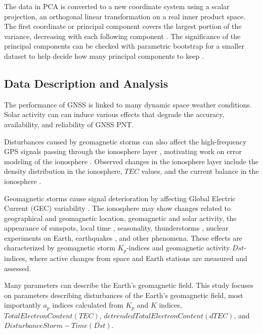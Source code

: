 \documentclass[sn-mathphys-num]{sn-jnl}%
\begin{document}
The data in PCA is converted to a new coordinate system using a scalar projection, an orthogonal linear transformation on a real inner product space. The first coordinate or principal component covers the largest portion of the variance, decreasing with each following component \cite{jolliffe2002principal, bengio2013representation}. The significance of the principal components can be checked with parametric bootstrap for a smaller dataset to help decide how many principal components to keep \cite{forkman2019hypothesis}.

\subsection{Data Description and Analysis}

The performance of GNSS is linked to many dynamic space weather conditions. Solar activity can \cite{tobiska1996current} can induce various effects that degrade the accuracy, availability, and reliability of GNSS PNT.

Disturbances caused by geomagnetic storms \cite{vitinsky1986statistics} can also affect the high-frequency GPS signals \cite{lanyi1988comparison} passing through the ionosphere layer \cite{rishbeth1969introduction, ratcliffe1972introduction}, motivating work on error modeling of the ionosphere \cite{klobuchar1986design, zolesi2014ionospheric}. Observed changes in the ionosphere layer include the density distribution in the ionosphere, $TEC$ values, and the current balance in the ionosphere \cite{komjathy2023global}.

Geomagnetic storms \cite{NOAA2024aRadioCommunications} cause signal deterioration by affecting Global Electric Current (GEC) variability \cite{Gray2019, Gray2021}. The ionosphere \cite{wild1994ionosphere} may show changes \cite{hawarey2010uzay} related to geographical and geomagnetic location, geomagnetic and solar activity, the appearance of sunspots, local time \cite{kotz2005encyclopedia}, seasonality, thunderstorms \cite{vellinov1992ionospheric}, nuclear experiments on Earth, earthquakes \cite{liu20142013}, and other phenomena. These effects are characterized by geomagnetic storm $K_{p}$-indices and geomagnetic activity $Dst$-indices, where active changes from space and Earth stations are measured and assessed.

Many parameters \cite{ulukavak2018analysis} can describe the Earth's geomagnetic field. This study focuses on parameters describing disturbances of the Earth's geomagnetic field, most importantly $a_{p}$ indices calculated from $K_{p}$ and $K$ indices, $Total Electron Content (TEC)$, $detrended Total Electron Content (dTEC)$, and $Disturbance Storm-Time (Dst)$. 
\end{document}
